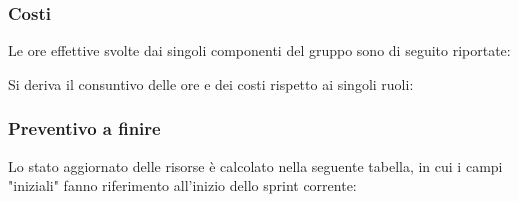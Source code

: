 \documentclass[10pt, letterpaper]{article}
\begin{document}
    \subsubsection{Costi}
    Le ore effettive svolte dai singoli componenti del gruppo sono di seguito riportate:

    \setRuoloFilippo{\Amm}
    \setRuoloChristian{\Verif}
    \setRuoloValeria{\Progr}
    \setRuoloGiuseppe{\Progr}
    \setRuoloFrancesco{\Resp}
    \setRuoloLuca{\Progr}
    \setRuoloLeonardo{\Progr}



    Si deriva il consuntivo delle ore e dei costi rispetto ai singoli ruoli:

    \subsubsection{Preventivo a finire}
    Lo stato aggiornato delle risorse è calcolato nella seguente tabella, in cui i campi "iniziali" fanno riferimento all'inizio dello sprint corrente:

\edef\oreTotRespRimaste{\fpeval{\oreTotRespRimaste + 8}}
\edef\budgetRespRimasto{\fpeval{\budgetRespRimasto + 240}}

\edef\oreTotAmmRimaste{\fpeval{\oreTotAmmRimaste + 10}}
\edef\budgetAmmRimasto{\fpeval{\budgetAmmRimasto + 200}}

\edef\oreTotAnalRimaste{\fpeval{\oreTotAnalRimaste +3}}
\edef\budgetAnalRimasto{\fpeval{\budgetAnalRimasto + 75}}

\edef\oreTotProgeRimaste{\fpeval{\oreTotProgeRimaste - 27}}
\edef\budgetProgeRimasto{\fpeval{\budgetProgeRimasto - 675}}

\edef\oreTotProgrRimaste{\fpeval{\oreTotProgrRimaste + 9}}
\edef\budgetProgrRimasto{\fpeval{\budgetProgrRimasto + 135}}

\end{document}
